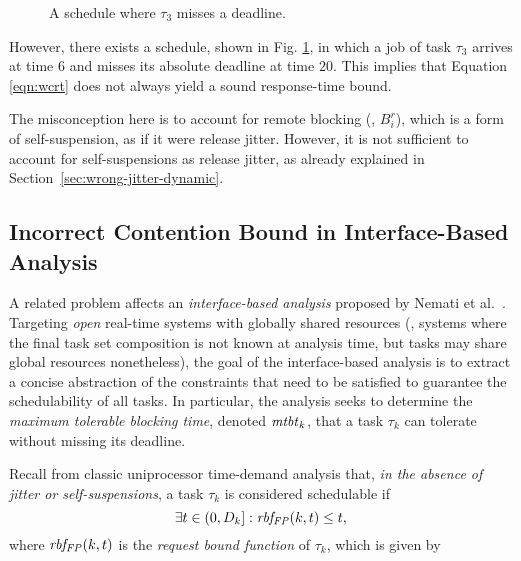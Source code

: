 \begin{figure}[t]
{}       
\caption{A schedule where $\tau_3$ misses a deadline.}
\label{fig:counterexample_protocol}
\end{figure}

\ifpaper
 \fi

However, there exists a schedule, shown in Fig. \ref{fig:counterexample_protocol}, in which a job of task $\tau_3$ arrives at time $6$ and misses its absolute deadline at time $20$. This implies that Equation \ref{eqn:wcrt} does not always yield a sound response-time bound. 

The misconception here is to account for remote blocking (\ie, $B_i^r$), which is a form of self-suspension, as if it were release jitter. However, it is not sufficient to account for self-suspensions as release jitter, as already explained in Section~\ref{sec:wrong-jitter-dynamic}.

\subsection{Incorrect Contention Bound in Interface-Based Analysis}

A related problem affects an \emph{interface-based analysis}  proposed by Nemati et al.~\cite{NBN:11}. Targeting \emph{open} real-time systems with globally shared resources (\ie, systems where the final task set composition is not known at analysis time, but tasks may share global resources nonetheless), the goal of the interface-based analysis is to extract a concise abstraction of the constraints that need to be satisfied  to guarantee the schedulability of all tasks. In particular, the analysis seeks to determine the \emph{maximum tolerable blocking time}, denoted $\mathit{mtbt}_k$, that a task $\tau_k$ can tolerate without missing its deadline. 

Recall from classic uniprocessor time-demand analysis \cite{lehoczky-1989} that, \emph{in the absence of jitter or self-suspensions}, a task $\tau_k$ is considered schedulable if
\begin{equation}
\label{eqn:rbf-1}
\exists t \in (0,D_k]: \mathit{rbf_{FP}}(k,t) \leq t, 
\end{equation}
where $\mathit{rbf_{FP}}(k,t)$ is the \emph{request bound function} of $\tau_k$, which is given by

